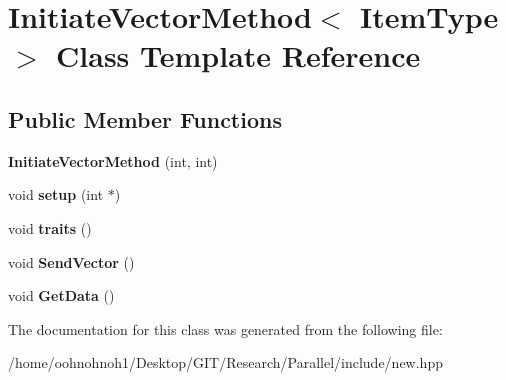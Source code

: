 \hypertarget{classInitiateVectorMethod}{}\section{Initiate\+Vector\+Method$<$ Item\+Type $>$ Class Template Reference}
\label{classInitiateVectorMethod}
\subsection*{Public Member Functions}
\begin{DoxyCompactItemize}
\item 
\mbox{\label{classInitiateVectorMethod_a9dd71b6c2afbb7d1dbccd86c5668df8d}} 
{\bfseries Initiate\+Vector\+Method} (int, int)
\item 
\mbox{\label{classInitiateVectorMethod_ab3126dd49f59f317a9908fa1d86c4e5c}} 
void {\bfseries setup} (int $\ast$)
\item 
\mbox{\label{classInitiateVectorMethod_a4cd80539ca03fc30bee98c9de786cbd8}} 
void {\bfseries traits} ()
\item 
\mbox{\label{classInitiateVectorMethod_aeefe1da73d131b57b36c8fcc25654683}} 
void {\bfseries Send\+Vector} ()
\item 
\mbox{\label{classInitiateVectorMethod_a0826022efb8056c18fe935be6675902b}} 
void {\bfseries Get\+Data} ()
\end{DoxyCompactItemize}


The documentation for this class was generated from the following file\+:\begin{DoxyCompactItemize}
\item 
/home/oohnohnoh1/\+Desktop/\+G\+I\+T/\+Research/\+Parallel/include/new.\+hpp\end{DoxyCompactItemize}
